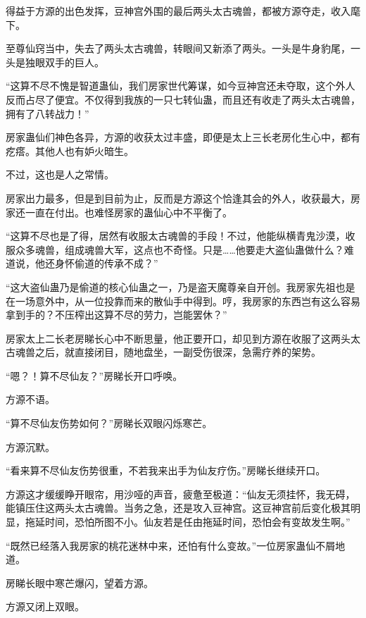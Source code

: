 
\begin{this_body}



得益于方源的出色发挥，豆神宫外围的最后两头太古魂兽，都被方源夺走，收入麾下。

至尊仙窍当中，失去了两头太古魂兽，转眼间又新添了两头。一头是牛身豹尾，一头是独眼双手的巨人。

“这算不尽不愧是智道蛊仙，我们房家世代筹谋，如今豆神宫还未夺取，这个外人反而占尽了便宜。不仅得到我族的一只七转仙蛊，而且还有收走了两头太古魂兽，拥有了八转战力！”

房家蛊仙们神色各异，方源的收获太过丰盛，即便是太上三长老房化生心中，都有疙瘩。其他人也有妒火暗生。

不过，这也是人之常情。

房家出力最多，但是到目前为止，反而是方源这个恰逢其会的外人，收获最大，房家还一直在付出。也难怪房家的蛊仙心中不平衡了。

“这算不尽也是了得，居然有收服太古魂兽的手段！不过，他能纵横青鬼沙漠，收服众多魂兽，组成魂兽大军，这点也不奇怪。只是……他要走大盗仙蛊做什么？难道说，他还身怀偷道的传承不成？”

“这大盗仙蛊乃是偷道的核心仙蛊之一，乃是盗天魔尊亲自开创。我房家先祖也是在一场意外中，从一位投靠而来的散仙手中得到。哼，我房家的东西岂有这么容易拿到手的？不压榨出这算不尽的劳力，岂能罢休？”

房家太上二长老房睇长心中不断思量，他正要开口，却见到方源在收服了这两头太古魂兽之后，就直接闭目，随地盘坐，一副受伤很深，急需疗养的架势。

“嗯？！算不尽仙友？”房睇长开口呼唤。

方源不语。

“算不尽仙友伤势如何？”房睇长双眼闪烁寒芒。

方源沉默。

“看来算不尽仙友伤势很重，不若我来出手为仙友疗伤。”房睇长继续开口。

方源这才缓缓睁开眼帘，用沙哑的声音，疲惫至极道：“仙友无须挂怀，我无碍，能镇压住这两头太古魂兽。当务之急，还是攻入豆神宫。这豆神宫前后变化极其明显，拖延时间，恐怕所图不小。仙友若是任由拖延时间，恐怕会有变故发生啊。”

“既然已经落入我房家的桃花迷林中来，还怕有什么变故。”一位房家蛊仙不屑地道。

房睇长眼中寒芒爆闪，望着方源。

方源又闭上双眼。


\end{this_body}
